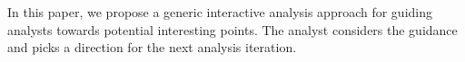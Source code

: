 \documentclass{vldb}
\begin{document}



In this paper, we propose a generic interactive analysis approach for guiding analysts towards potential interesting points. The analyst considers the guidance and picks a direction for the next analysis iteration. 










\end{document}
